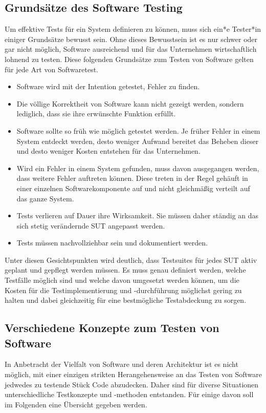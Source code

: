 \subsection{Grundsätze des Software Testing}\label{subsec:testinginqa}
Um effektive Tests für ein System definieren zu können, muss sich ein*e Tester*in einiger Grundsätze bewusst sein. Ohne dieses Bewusstsein ist es nur schwer oder gar nicht möglich, Software ausreichend und für das Unternehmen wirtschaftlich lohnend zu testen. Diese folgenden Grundsätze zum Testen von Software gelten für jede Art von Softwaretest.
\begin{itemize}
    \item Software wird mit der Intention getestet, Fehler zu finden. \cite[S. 6]{myers:2011}\cite[S. 11]{witte:2019}
    \item Die völlige Korrektheit von Software kann nicht gezeigt werden, sondern lediglich, dass sie ihre erwünschte Funktion erfüllt. \cite[S. 19]{ammann:2016}\cite[S. 12]{witte:2019}
    \item Software sollte so früh wie möglich getestet werden. Je früher Fehler in einem System entdeckt werden, desto weniger Aufwand bereitet das Beheben dieser und desto weniger Kosten entstehen für das Unternehmen. \cite[S. 12]{witte:2019} \cite[Fig. 1.3]{desikan:2006}
    \item Wird ein Fehler in einem System gefunden, muss davon ausgegangen werden, dass weitere Fehler auftreten können. Diese treten in der Regel gehäuft in einer einzelnen Softwarekomponente auf und nicht gleichmäßig verteilt auf das ganze System. \cite[S. 13]{witte:2019}
    \item Tests verlieren auf Dauer ihre Wirksamkeit. Sie müssen daher ständig an das sich stetig verändernde \ac{SUT} angepasst werden. \cite[S. 13f.]{witte:2019}
    \item Tests müssen nachvollziehbar sein und dokumentiert werden. \cite[S. 14f.]{witte:2019}
\end{itemize}

Unter diesen Gesichtspunkten wird deutlich, dass Testsuites für jedes \ac{SUT} aktiv geplant und gepflegt werden müssen. Es muss genau definiert werden, welche Testfälle möglich sind und welche davon umgesetzt werden können, um die Kosten für die Testimplementierung und -durchführung möglichst gering zu halten und dabei gleichzeitig für eine bestmögliche Testabdeckung zu sorgen.

\subsection{Verschiedene Konzepte zum Testen von Software}\label{subsec:testkonzepte}
In Anbetracht der Vielfalt von Software und deren Architektur ist es nicht möglich, mit einer einzigen strikten Herangehensweise an das Testen von Software jedwedes zu testende Stück Code abzudecken. Daher sind für diverse Situationen unterschiedliche Testkonzepte und -methoden entstanden. Für einige davon soll im Folgenden eine Übersicht gegeben werden.

